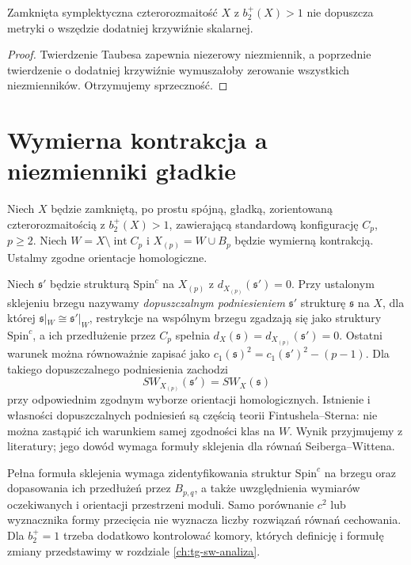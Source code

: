 \begin{wniosek}
Zamknięta symplektyczna czterorozmaitość
$X$ z $b_2^+(X)>1$ nie dopuszcza metryki o wszędzie
dodatniej krzywiźnie skalarnej.
\end{wniosek}

\begin{proof}
Twierdzenie Taubesa zapewnia niezerowy niezmiennik,
a poprzednie twierdzenie o dodatniej krzywiźnie
wymuszałoby zerowanie wszystkich niezmienników.
Otrzymujemy sprzeczność.
\end{proof}

\section{Wymierna kontrakcja a niezmienniki gładkie}
\label{sec:tg-sw-rb}

\begin{twierdzenie}
\label{thm:tg-sw-rbprinciple}
Niech $X$ będzie zamkniętą, po prostu spójną,
gładką, zorientowaną czterorozmaitością z
$b_2^+(X)>1$, zawierającą standardową konfigurację
$C_p$, $p\geq2$. Niech $W=X\setminus\operatorname{int}C_p$
i $X_{(p)}=W\cup B_p$ będzie wymierną kontrakcją.
Ustalmy zgodne orientacje homologiczne.

Niech $\mathfrak s'$ będzie strukturą $\mathrm{Spin}^c$
na $X_{(p)}$ z $d_{X_{(p)}}(\mathfrak s')=0$.
Przy ustalonym sklejeniu brzegu nazywamy
\emph{dopuszczalnym podniesieniem} $\mathfrak s'$
strukturę $\mathfrak s$ na $X$, dla której
$\mathfrak s|_W\cong\mathfrak s'|_W$, restrykcje na
wspólnym brzegu zgadzają się jako struktury
$\mathrm{Spin}^c$, a ich przedłużenie przez $C_p$
spełnia $d_X(\mathfrak s)=d_{X_{(p)}}(\mathfrak s')=0$.
Ostatni warunek można równoważnie zapisać jako
$c_1(\mathfrak s)^2=c_1(\mathfrak s')^2-(p-1)$.
Dla takiego dopuszczalnego podniesienia zachodzi
\[
SW_{X_{(p)}}(\mathfrak s')=SW_X(\mathfrak s)
\]
przy odpowiednim zgodnym wyborze orientacji homologicznych.
Istnienie i własności dopuszczalnych podniesień są częścią
teorii Fintushela--Sterna: nie można zastąpić ich
warunkiem samej zgodności klas na $W$.
Wynik przyjmujemy z literatury; jego dowód wymaga
formuły sklejenia dla równań Seiberga--Wittena.
\end{twierdzenie}

\begin{uwaga}
Pełna formuła sklejenia wymaga zidentyfikowania struktur
$\mathrm{Spin}^c$ na brzegu oraz dopasowania ich przedłużeń
przez $B_{p,q}$, a także uwzględnienia wymiarów
oczekiwanych i orientacji przestrzeni moduli. Samo
porównanie $c^2$ lub wyznacznika formy przecięcia
nie wyznacza liczby rozwiązań równań cechowania.
Dla $b_2^+=1$ trzeba dodatkowo kontrolować komory,
których definicję i formułę zmiany przedstawimy w rozdziale
\ref{ch:tg-sw-analiza}.
\end{uwaga}

